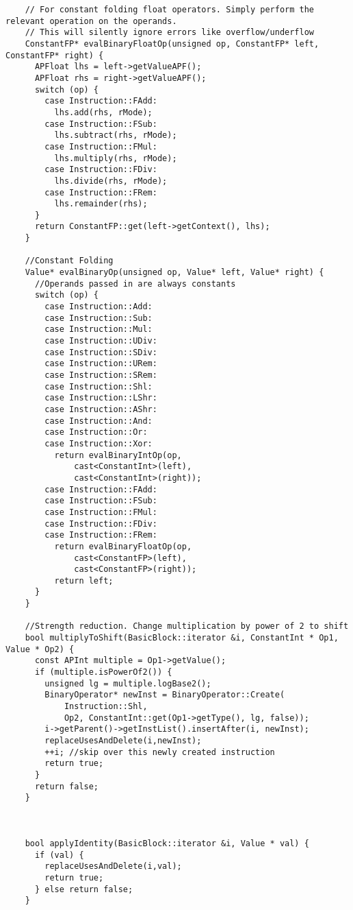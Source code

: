 \documentclass[12pt]{article}
\begin{document}
\begin{verbatim}
    // For constant folding float operators. Simply perform the relevant operation on the operands.
    // This will silently ignore errors like overflow/underflow
    ConstantFP* evalBinaryFloatOp(unsigned op, ConstantFP* left, ConstantFP* right) {
      APFloat lhs = left->getValueAPF();
      APFloat rhs = right->getValueAPF();
      switch (op) {
        case Instruction::FAdd:
          lhs.add(rhs, rMode);
        case Instruction::FSub:
          lhs.subtract(rhs, rMode);
        case Instruction::FMul:
          lhs.multiply(rhs, rMode);
        case Instruction::FDiv:
          lhs.divide(rhs, rMode);
        case Instruction::FRem:
          lhs.remainder(rhs);
      }
      return ConstantFP::get(left->getContext(), lhs);
    }

    //Constant Folding
    Value* evalBinaryOp(unsigned op, Value* left, Value* right) {
      //Operands passed in are always constants
      switch (op) {
        case Instruction::Add:
        case Instruction::Sub:
        case Instruction::Mul:
        case Instruction::UDiv:
        case Instruction::SDiv:
        case Instruction::URem:
        case Instruction::SRem:
        case Instruction::Shl:
        case Instruction::LShr:
        case Instruction::AShr:
        case Instruction::And:
        case Instruction::Or:
        case Instruction::Xor:
          return evalBinaryIntOp(op, 
              cast<ConstantInt>(left), 
              cast<ConstantInt>(right));
        case Instruction::FAdd:
        case Instruction::FSub:
        case Instruction::FMul:
        case Instruction::FDiv:
        case Instruction::FRem:
          return evalBinaryFloatOp(op, 
              cast<ConstantFP>(left), 
              cast<ConstantFP>(right));
          return left;
      }
    }

    //Strength reduction. Change multiplication by power of 2 to shift
    bool multiplyToShift(BasicBlock::iterator &i, ConstantInt * Op1, Value * Op2) {
      const APInt multiple = Op1->getValue();
      if (multiple.isPowerOf2()) {
        unsigned lg = multiple.logBase2();
        BinaryOperator* newInst = BinaryOperator::Create(
            Instruction::Shl, 
            Op2, ConstantInt::get(Op1->getType(), lg, false));
        i->getParent()->getInstList().insertAfter(i, newInst);
        replaceUsesAndDelete(i,newInst);
        ++i; //skip over this newly created instruction
        return true;
      }
      return false;
    }



    bool applyIdentity(BasicBlock::iterator &i, Value * val) {
      if (val) {
        replaceUsesAndDelete(i,val);
        return true;
      } else return false;
    }


\end{verbatim}
\end{document}
